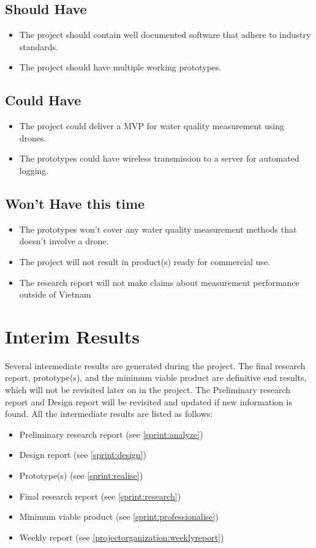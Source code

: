 \documentclass[11pt, a4paper]{article}
\begin{document}
\subsection{Should Have}
\begin{itemize}
  \item The project should contain well documented software that adhere to industry standards.
  \item The project should have multiple working prototypes.
\end{itemize}
\subsection{Could Have}
\begin{itemize}
  \item The project could deliver a MVP for water quality measurement using drones.
  \item The prototypes could have wireless transmission to a server for automated logging.
\end{itemize}
\subsection{Won’t Have this time}
\begin{itemize}
  \item The prototypes won't cover any water quality measurement methods that doesn't involve a drone.
  \item The project will not result in product(s) ready for commercial use.
  \item The research report will not make claims about measurement performance outside of Vietnam
\end{itemize}
\pagebreak
\section{Interim Results}\label{interimresults}
Several intermediate results are generated during the project. The final research report, prototype(s), and the minimum viable product are definitive end results, which will not be revisited later on in the project. The Preliminary research report and Design report will be revisited and updated if new information is found. All the intermediate results are listed as follows:
\begin{itemize}
  \item Preliminary research report (see \ref{sprint:analyze})
  \item Design report (see \ref{sprint:design})
  \item Prototype(s) (see \ref{sprint:realise})
  \item Final research report (see \ref{sprint:research})
  \item Minimum viable product (see \ref{sprint:professionalise})
  \item Weekly report (see \ref{projectorganization:weeklyreport})
\end{itemize}
\end{document}
